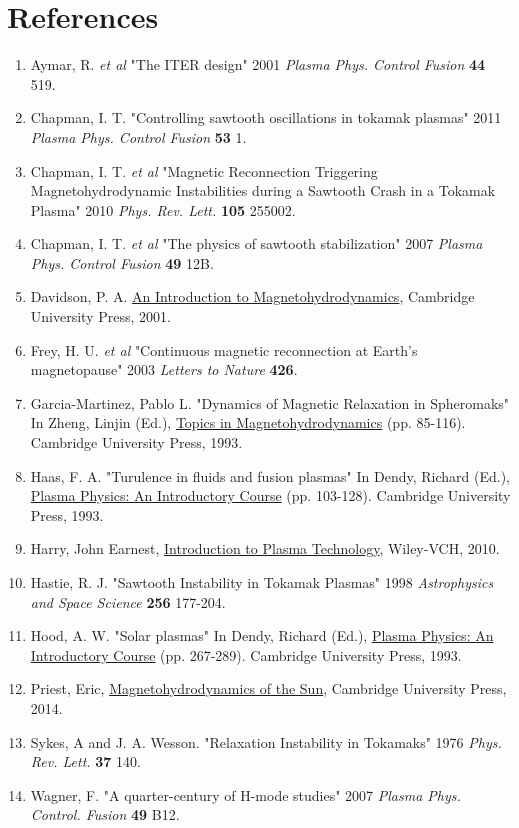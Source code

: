 \documentclass{article}
\begin{document}
\newpage
\section{References}
\begin{enumerate}
\item Aymar, R. \textit{et al} "The ITER design" 2001 \textit{Plasma Phys. Control Fusion} \textbf{44} 519.
\item Chapman, I. T. "Controlling sawtooth oscillations in tokamak plasmas" 2011 \textit{Plasma Phys. Control Fusion} \textbf{53} 1.
\item Chapman, I. T. \textit{et al} "Magnetic Reconnection Triggering Magnetohydrodynamic Instabilities during a Sawtooth Crash in a Tokamak Plasma" 2010 \textit{Phys. Rev. Lett.} \textbf{105} 255002.
\item Chapman, I. T. \textit{et al} "The physics of sawtooth stabilization" 2007 \textit{Plasma Phys. Control Fusion} \textbf{49} 12B.
\item Davidson, P. A. \underline{An Introduction to Magnetohydrodynamics}, Cambridge University Press, 2001.
\item Frey, H. U. \textit{et al} "Continuous magnetic reconnection at Earth's magnetopause" 2003 \textit{Letters to Nature} \textbf{426}.
\item Garcia-Martinez, Pablo L. "Dynamics of Magnetic Relaxation in Spheromaks" In Zheng, Linjin (Ed.), \underline{Topics in Magnetohydrodynamics} (pp. 85-116). Cambridge University Press, 1993.
\item Haas, F. A. "Turulence in fluids and fusion plasmas" In Dendy, Richard (Ed.), \underline{Plasma Physics: An Introductory Course} (pp. 103-128). Cambridge University Press, 1993.
\item Harry, John Earnest,  \underline{Introduction to Plasma Technology}, Wiley-VCH, 2010.
\item Hastie, R. J. "Sawtooth Instability in Tokamak Plasmas" 1998 \textit{Astrophysics and Space Science} \textbf{256} 177-204.
\item Hood, A. W. "Solar plasmas" In Dendy, Richard (Ed.), \underline{Plasma Physics: An Introductory Course} (pp. 267-289). Cambridge University Press, 1993.
\item Priest, Eric,  \underline{Magnetohydrodynamics of the Sun},  Cambridge University Press, 2014.
\item Sykes, A and J. A. Wesson.  "Relaxation Instability in Tokamaks" 1976 \textit{Phys. Rev. Lett.} \textbf{37} 140.
\item Wagner, F. "A quarter-century of H-mode studies" 2007 \textit{Plasma Phys. Control. Fusion} \textbf{49} B12.

\end{enumerate}
\end{document}
